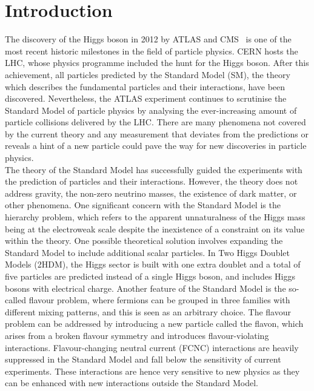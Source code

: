 \setchapterpreamble[u]{\margintoc}
\chapter*{Introduction}

The discovery of the Higgs boson in 2012 by ATLAS and CMS~\cite{ATLASHiggs2012,CMShiggs2012} is one of the most recent historic milestones in the field of particle physics. CERN hosts the LHC, whose physics programme included the hunt for the Higgs boson. After this achievement, all particles predicted by the Standard Model (SM), the theory which describes the fundamental particles and their interactions, have been discovered. Nevertheless, the ATLAS experiment continues to scrutinise the Standard Model of particle physics by analysing the ever-increasing amount of particle collisions delivered by the LHC. There are many phenomena not covered by the current theory and any measurement that deviates from the predictions or reveals a hint of a new particle could pave the way for new discoveries in particle physics.\\

The theory of the Standard Model has successfully guided the experiments with the prediction of particles and their interactions. However, the theory does not address gravity, the non-zero neutrino masses, the existence of dark matter, or other phenomena. One significant concern with the Standard Model is the hierarchy problem, which refers to the apparent unnaturalness of the Higgs mass being at the electroweak scale despite the inexistence of a constraint on its value within the theory. One possible theoretical solution involves expanding the Standard Model to include additional scalar particles. In Two Higgs Doublet Models (2HDM), the Higgs sector is built with one extra doublet and a total of five particles are predicted instead of a single Higgs boson, and includes Higgs bosons with electrical charge.
Another feature of the Standard Model is the so-called flavour problem, where fermions can be grouped in three families with different mixing patterns, and this is seen as an arbitrary choice. The flavour problem can be addressed by introducing a new particle called the flavon, which arises from a broken flavour symmetry and introduces flavour-violating interactions. Flavour-changing neutral current (FCNC) interactions are heavily suppressed in the Standard Model and fall below the sensitivity of current experiments. These interactions are hence very sensitive to new physics as they can be enhanced with new interactions outside the Standard Model.\\

